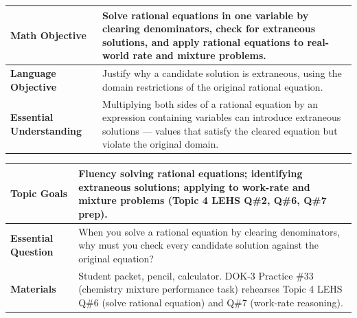 \documentclass[11pt]{article}
\newcommand{\lessonrow}[2]{\textbf{#1} & #2 \\ \hline}
\begin{document}

{\small
\renewcommand{\arraystretch}{1.25}
\noindent\begin{tabular}{|p{1.8in}|p{4.8in}|}
\hline
\lessonrow{Math Objective}{Solve rational equations in one variable by clearing denominators, check for extraneous solutions, and apply rational equations to real-world rate and mixture problems.}
\lessonrow{Language Objective}{Justify why a candidate solution is extraneous, using the domain restrictions of the original rational equation.}
\lessonrow{Essential Understanding}{Multiplying both sides of a rational equation by an expression containing variables can introduce extraneous solutions --- values that satisfy the cleared equation but violate the original domain.}
\end{tabular}
}

{\small
\renewcommand{\arraystretch}{1.25}
\noindent\begin{tabular}{|p{1.8in}|p{4.8in}|}
\hline
\lessonrow{Topic Goals}{Fluency solving rational equations; identifying extraneous solutions; applying to work-rate and mixture problems (Topic 4 LEHS Q\#2, Q\#6, Q\#7 prep).}
\lessonrow{Essential Question}{When you solve a rational equation by clearing denominators, why must you check every candidate solution against the original equation?}
\lessonrow{Materials}{Student packet, pencil, calculator. DOK-3 Practice \#33 (chemistry mixture performance task) rehearses Topic 4 LEHS Q\#6 (solve rational equation) and Q\#7 (work-rate reasoning).}
\end{tabular}
}

\end{document}
